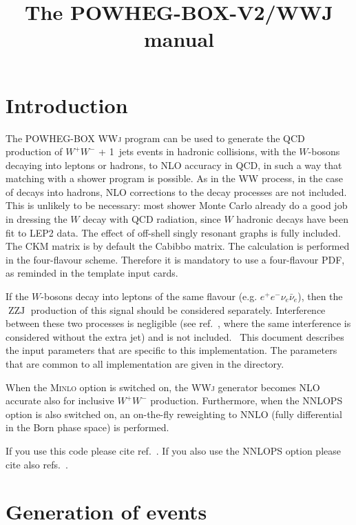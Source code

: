 \documentclass{paper}
\newcommand{\tmop}[1]{\ensuremath{\operatorname{#1}}}
\newcommand{\tmtexttt}[1]{{\ttfamily{#1}}}
\newcommand{\noun}[1]{\textsc{#1}}
\newcommand{\WW}{\noun{WW}}
\newcommand{\WWJ}{\noun{WWj}}
\newcommand{\MINLO}{\noun{Minlo}}
\newcommand{\NNLOPS}{\noun{NNLOPS}}
\begin{document}
\title{The POWHEG-BOX-V2/WWJ manual}

\maketitle

\section{Introduction}

The POWHEG-BOX \WWJ{} program {\cite{Hamilton:2016bfu}} can be used to
generate the QCD production of $W^+ W^-$ + 1~jets events in hadronic
collisions, with the $W$-bosons decaying into leptons or hadrons, to
NLO accuracy in QCD, in such a way that matching with a shower program
is possible. As in the \WW{} process, in the case of decays into
hadrons, NLO corrections to the decay processes are not included. This
is unlikely to be necessary: most shower Monte Carlo already do a good
job in dressing the $W$ decay with QCD radiation, since $W$ hadronic
decays have been fit to LEP2 data. The effect of off-shell singly
resonant graphs is fully included. The CKM matrix is by default the
Cabibbo matrix. The calculation is performed in the four-flavour
scheme. Therefore it is mandatory to use a four-flavour PDF, as
reminded in the template input cards.

If the $W$-bosons decay into leptons of the same flavour (e.g. $e^+
e^- \nu_e \bar{\nu}_e$), then the $\tmop{ZZJ}$ production of this
signal should be considered separately. Interference between these two
processes is negligible (see ref.~\cite{Melia:2011tj}, where the same
interference is considered without the extra jet) and is not
included. \ This document describes the input parameters that are
specific to this implementation. The parameters that are common to all
\tmtexttt{POWHEG BOX} implementation are given in the
\tmtexttt{POWHEG-BOX-V2/Docs} directory.

When the \MINLO{} option is switched on, the \WWJ{} generator becomes
NLO accurate also for inclusive $W^+ W^-$ production. Furthermore,
when the \NNLOPS{} option is also switched on, an on-the-fly
reweighting to NNLO (fully differential in the Born phase space) is
performed.

If you use this code please cite ref.~\cite{Hamilton:2016bfu}. If you
also use the \NNLOPS{} option please cite also
refs.~\cite{Grazzini:2016ctr,Grazzini:2017mhc,Re:2018vac}.


\section{Generation of events}
\end{document}
